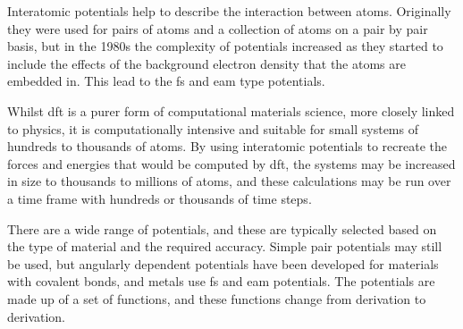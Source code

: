 Interatomic potentials help to describe the interaction between atoms.  Originally they were used for pairs of atoms and a collection of atoms on a pair by pair basis, but in the 1980s the complexity of potentials increased as they started to include the effects of the background electron density that the atoms are embedded in.  This lead to the \acrfull{fs} and \acrfull{eam} type potentials.

Whilst \acrshort{dft} is a purer form of computational materials science, more closely linked to physics, it is computationally intensive and suitable for small systems of hundreds to thousands of atoms.  By using interatomic potentials to recreate the forces and energies that would be computed by \acrshort{dft}, the systems may be increased in size to thousands to millions of atoms, and these calculations may be run over a time frame with hundreds or thousands of time steps.

There are a wide range of potentials, and these are typically selected based on the type of material and the required accuracy.  Simple pair potentials may still be used, but angularly dependent potentials have been developed for materials with covalent bonds, and metals use \acrshort{fs} and \acrshort{eam} potentials.  The potentials are made up of a set of functions, and these functions change from derivation to derivation.  








